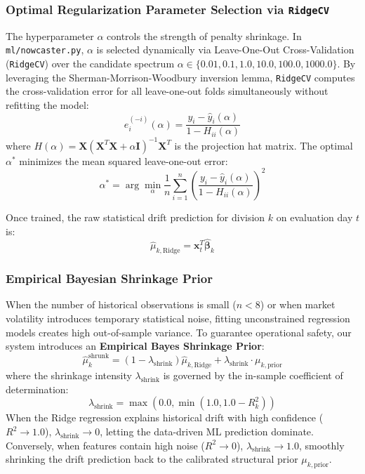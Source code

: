 \documentclass[11pt,a4paper,oneside]{article}
\begin{document}
\subsubsection{Optimal Regularization Parameter Selection via \texttt{RidgeCV}}
The hyperparameter $\alpha$ controls the strength of penalty shrinkage. In \texttt{ml/nowcaster.py}, $\alpha$ is selected dynamically via Leave-One-Out Cross-Validation (\texttt{RidgeCV}) over the candidate spectrum $\alpha \in \{0.01, 0.1, 1.0, 10.0, 100.0, 1000.0\}$. By leveraging the Sherman-Morrison-Woodbury inversion lemma, \texttt{RidgeCV} computes the cross-validation error for all leave-one-out folds simultaneously without refitting the model:
\begin{equation}
e_{i}^{(-i)}(\alpha) = \frac{y_i - \hat{y}_i(\alpha)}{1 - H_{ii}(\alpha)}
\end{equation}
where $H(\alpha) = \mathbf{X}(\mathbf{X}^T \mathbf{X} + \alpha \mathbf{I})^{-1}\mathbf{X}^T$ is the projection hat matrix. The optimal $\alpha^*$ minimizes the mean squared leave-one-out error:
\begin{equation}
\alpha^* = \arg\min_{\alpha} \frac{1}{n} \sum_{i=1}^n \left( \frac{y_i - \hat{y}_i(\alpha)}{1 - H_{ii}(\alpha)} \right)^2
\end{equation}

Once trained, the raw statistical drift prediction for division $k$ on evaluation day $t$ is:
\begin{equation}
\hat{\mu}_{k, \text{Ridge}} = \mathbf{x}_t^T \hat{\boldsymbol{\beta}}_k
\end{equation}

\subsubsection{Empirical Bayesian Shrinkage Prior}
When the number of historical observations is small ($n < 8$) or when market volatility introduces temporary statistical noise, fitting unconstrained regression models creates high out-of-sample variance. To guarantee operational safety, our system introduces an \textbf{Empirical Bayes Shrinkage Prior}:
\begin{equation}
\hat{\mu}_k^{\text{shrunk}} = (1 - \lambda_{\text{shrink}}) \hat{\mu}_{k, \text{Ridge}} + \lambda_{\text{shrink}} \cdot \mu_{k, \text{prior}}
\end{equation}
where the shrinkage intensity $\lambda_{\text{shrink}}$ is governed by the in-sample coefficient of determination:
\begin{equation}
\lambda_{\text{shrink}} = \max\left(0.0, \min\left(1.0, 1.0 - R_k^2\right)\right)
\end{equation}
When the Ridge regression explains historical drift with high confidence ($R^2 \to 1.0$), $\lambda_{\text{shrink}} \to 0$, letting the data-driven ML prediction dominate. Conversely, when features contain high noise ($R^2 \to 0$), $\lambda_{\text{shrink}} \to 1.0$, smoothly shrinking the drift prediction back to the calibrated structural prior $\mu_{k, \text{prior}}$.
\end{document}
